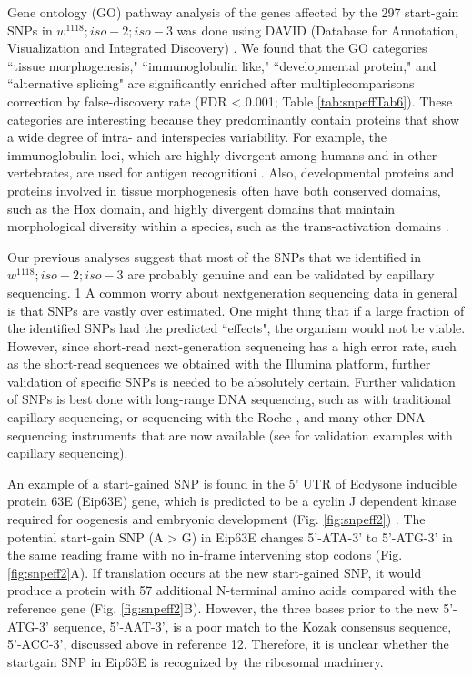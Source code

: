 Gene ontology (GO) pathway analysis of the genes affected by the 297 start-gain SNPs in $w^{1118} ; iso-2; iso-3$ was done using DAVID (Database for Annotation, Visualization and Integrated Discovery) \cite{dennis2003david,hosack2003identifying}. We found that the GO categories ``tissue morphogenesis," ``immunoglobulin like," ``developmental protein," and ``alternative splicing" are significantly enriched after multiplecomparisons correction by false-discovery rate (FDR < 0.001; Table \ref{tab:snpeffTab6}). These categories are interesting because they predominantly contain proteins that show a wide degree of intra- and interspecies variability. For example, the immunoglobulin loci, which are highly divergent among humans and in other vertebrates, are used for antigen recognitioni \cite{lazure1981sequence}. Also, developmental proteins and proteins involved in tissue morphogenesis often have both conserved domains, such as the Hox domain, and highly divergent domains that maintain morphological diversity within a species, such as the trans-activation domains \cite{ruden2008edge,guarente1991generating}.

Our previous analyses suggest that most of the SNPs that we identified in $w^{1118} ; iso-2; iso-3$ are probably genuine and can be validated by capillary sequencing. 1 A common worry about nextgeneration sequencing data in general is that SNPs are vastly over estimated. One might thing that if a large fraction of the identified SNPs had the predicted ``effects", the organism would not be viable. However, since short-read next-generation sequencing has a high error rate, such as the short-read sequences we obtained with the Illumina platform, further validation of specific SNPs is needed to be absolutely certain. Further validation of SNPs is best done with long-range DNA sequencing, such as with traditional capillary sequencing, or sequencing with the Roche \cite{wheeler2008complete}, and many other DNA sequencing instruments that are now available \cite{schadt2011first} (see \cite{platts2009massively} for validation examples with capillary sequencing).

An example of a start-gained SNP is found in the 5' UTR of Ecdysone inducible protein 63E (Eip63E) gene, which is predicted to be a cyclin J dependent kinase required for oogenesis and embryonic development (Fig. \ref{fig:snpeff2}) \cite{liu2010cyclin}. The potential start-gain SNP (A > G) in Eip63E changes 5'-ATA-3' to 5'-ATG-3' in the same reading frame with no in-frame intervening stop codons (Fig. \ref{fig:snpeff2}A). If translation occurs at the new start-gained SNP, it would produce a protein with 57 additional N-terminal amino acids compared with the reference gene (Fig. \ref{fig:snpeff2}B). However, the three bases prior to the new 5'-ATG-3' sequence, 5'-AAT-3', is a poor match to the Kozak consensus sequence, 5'-ACC-3', discussed above in reference 12. Therefore, it is unclear whether the startgain SNP in Eip63E is recognized by the ribosomal machinery.

